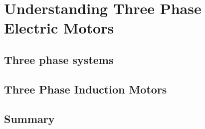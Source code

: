 \chapter{Understanding Three Phase Electric Motors}
\label{cha:users_manual}

\section{Three phase systems} %
\label{sec:introduction}

\section{Three Phase Induction Motors} %
\label{sec:three_phase_induction_motors}

\section{Summary} %
\label{sec:related_work_summary}
